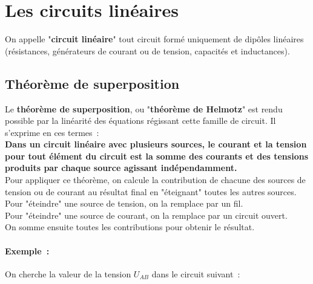 \chapter{Les circuits linéaires}

On appelle "\textbf{circuit linéaire}" tout circuit formé uniquement de dipôles linéaires (résistances, générateurs de courant ou de tension, capacités et inductances).

\section{Théorème de superposition}

Le \textbf{théorème de superposition}, ou "\textbf{théorème de Helmotz}" est rendu possible par la linéarité des équations régissant cette famille de circuit. Il s'exprime en ces termes~:\\

\textbf{Dans un circuit linéaire avec plusieurs sources, le courant et la tension pour tout élément du circuit est la somme des courants et des tensions produits par chaque source agissant indépendamment.} \\

Pour appliquer ce théorème, on calcule la contribution de chacune des sources de tension ou de courant au résultat final en "éteignant" toutes les autres sources.\\

Pour "éteindre" une source de tension, on la remplace par un fil. \\

Pour "éteindre" une source de courant, on la remplace par un circuit ouvert. \\

On somme ensuite toutes les contributions pour obtenir le résultat.

\subsubsection*{Exemple~:}

On cherche la valeur de la tension $U_{AB}$ dans le circuit suivant~:

\begin{center}
	
\end{center}















